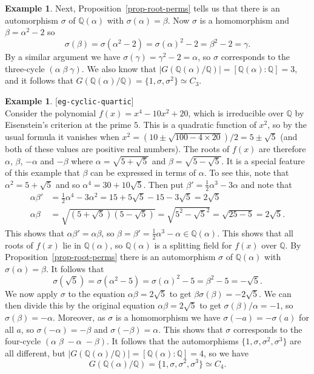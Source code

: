 \documentclass{amsart}
\newcommand{\lbl}[1]{\label{#1}\textup{[\texttt{#1}]}\ \\}
\newcommand{\lbl}{\label}
\newcommand{\Q}         {{\mathbb{Q}}}
\newcommand{\al}        {\alpha}
\newcommand{\bt}        {\beta}
\newcommand{\gm}        {\gamma}
\newcommand{\sg}        {\sigma}
\newcommand{\tm}        {\times}
\newcommand{\half}      {{\textstyle\frac{1}{2}}}
\renewcommand{\:}{\colon}
\theoremstyle{definition}
\newtheorem{example}[theorem]{Example}
\begin{document}
\begin{example}
 Next, Proposition~\ref{prop-root-perms} tells us that there is an
 automorphism $\sg$ of $\Q(\al)$ with $\sg(\al)=\bt$.  Now $\sg$ is a
 homomorphism and $\bt=\al^2-2$ so 
 \[ \sg(\bt)=\sg(\al^2-2)=\sg(\al)^2-2=\bt^2-2=\gm. \]
 By a similar argument we have $\sg(\gm)=\gm^2-2=\al$, so $\sg$
 corresponds to the three-cycle $(\al\;\bt\;\gm)$.  We also know that
 $|G(\Q(\al)/\Q)|=[\Q(\al):\Q]=3$, and it follows that
 $G(\Q(\al)/\Q)=\{1,\sg,\sg^2\}\simeq C_3$.
\end{example}

\begin{example}\lbl{eg-cyclic-quartic}
 Consider the polynomial $f(x)=x^4-10x^2+20$, which is irreducible
 over $\Q$ by Eisenstein's criterion at the prime $5$.  This is a
 quadratic function of $x^2$, so by the usual formula it vanishes when
 $x^2=(10\pm\sqrt{100-4\tm 20})/2=5\pm\sqrt{5}$ (and both of these
 values are positive real numbers).  The roots of $f(x)$ are therefore
 $\al$, $\bt$, $-\al$ and $-\bt$ where $\al=\sqrt{5+\sqrt{5}}$ and
 $\bt=\sqrt{5-\sqrt{5}}$.  It is a special feature of this example
 that $\bt$ can be expressed in terms of $\al$.  To see this, note
 that $\al^2=5+\sqrt{5}$ and so $\al^4=30+10\sqrt{5}$.  Then put
 $\bt'=\half\al^3-3\al$ and note that
 \begin{align*}
   \al\bt' &= \half\al^4-3\al^2 = 
     15+5\sqrt{5}-15-3\sqrt{5} = 2\sqrt{5}  \\
   \al\bt &= \sqrt{(5+\sqrt{5})(5-\sqrt{5})} = 
     \sqrt{5^2 - \sqrt{5}^2} = \sqrt{25-5} = 2\sqrt{5}.
 \end{align*}
 This shows that $\al\bt'=\al\bt$, so
 $\bt=\bt'=\half\al^3-\al\in\Q(\al)$.  This shows that all roots of
 $f(x)$ lie in $\Q(\al)$, so $\Q(\al)$ is a splitting field for $f(x)$
 over $\Q$.   By Proposition~\ref{prop-root-perms} there is an
 automorphism $\sg$ of $\Q(\al)$ with $\sg(\al)=\bt$.  It follows that 
 \[ \sg(\sqrt{5})=\sg(\al^2-5)=\sg(\al)^2-5=\bt^2-5=-\sqrt{5}. \]
 We now apply $\sg$ to the equation $\al\bt=2\sqrt{5}$ to get
 $\bt\sg(\bt)=-2\sqrt{5}$.  We can then divide this by the original
 equation $\al\bt=2\sqrt{5}$ to get $\sg(\bt)/\al=-1$, so
 $\sg(\bt)=-\al$.  Moreover, as $\sg$ is a homomorphism we have
 $\sg(-a)=-\sg(a)$ for all $a$, so $\sg(-\al)=-\bt$ and
 $\sg(-\bt)=\al$.  This shows that $\sg$ corresponds to the four-cycle
 $(\al\;\bt\;-\al\;-\bt)$.  It follows that the automorphisms
 $\{1,\sg,\sg^2,\sg^3\}$ are all different, but
 $|G(\Q(\al)/\Q)|=[\Q(\al):\Q]=4$, so we have 
 \[ G(\Q(\al)/\Q)=\{1,\sg,\sg^2,\sg^3\}\simeq C_4. \]
\end{example}
\end{document}
